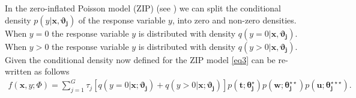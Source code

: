 \documentclass[11pt,letterpaper]{article}
\numberwithin{equation}{section}
\numberwithin{equation}{section}
\numberwithin{equation}{section}
\begin{document}
In the zero-inflated Poisson model (ZIP) (see \cite{Lambert}) we can split the conditional density $p(y|\bm{x},\bm{\vartheta_j})$ of the response variable $y$, into zero and non-zero densities. %
When $y = 0$ the response variable $y$ is distributed with density $q(y = 0|\bm{x},\bm{\vartheta_{j}})$. When $y > 0$ the response variable $y$ is distributed with density $q(y > 0|\bm{x}, \bm{\vartheta_{j}} )$. Given the conditional density now defined for the ZIP model \eqref{eq3}
can be re-written as follows
 \begin{align}
 f(\bm x, y; \Phi)= \sum_{j=1}^{G} \tau_j \left[ q(y = 0|\bm{x};\bm{\vartheta_{j} }) +  q(y > 0|\bm{x} ; \bm{\vartheta_{j}}  ) \right]   p(\bm{t};\bm{\theta_j^{\star}})p(\bm{w};\bm{\theta_j^{\star\star}})p(\bm{u};\bm{\theta_j^{\star\star\star}}).
\end{align}
\end{document}
